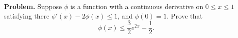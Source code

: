 \documentclass[12pt]{article}
\title{}
\date{}
\begin{document}
\noindent
{\bf Problem.}
Suppose $\phi$ is a function with a continuous derivative on $0 \leq x \leq 1$ satisfying there $\phi'(x) -2\phi(x) \leq 1$, and $\phi(0) = 1$. Prove that
\[
  \phi(x) \leq \frac{3}{2}e^{2x} - \frac{1}{2}.
\]
\end{document}
